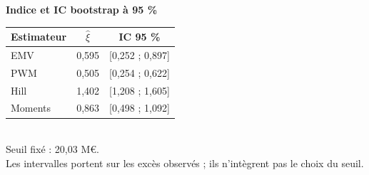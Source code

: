 \small\textbf{Indice et IC bootstrap à 95 \%}\\[2mm]
\begin{tabular}{@{}lcc@{}}\toprule Estimateur & $\hat\xi$ & IC 95 \% \\\midrule
EMV & 0{,}595 & [0{,}252 ; 0{,}897] \\
PWM & 0{,}505 & [0{,}254 ; 0{,}622] \\
Hill & 1{,}402 & [1{,}208 ; 1{,}605] \\
Moments & 0{,}863 & [0{,}498 ; 1{,}092] \\
\bottomrule\end{tabular}\\[2mm]
\footnotesize Seuil fixé : 20,03 M€.\\
Les intervalles portent sur les excès observés ; ils n’intègrent pas le choix du seuil.
